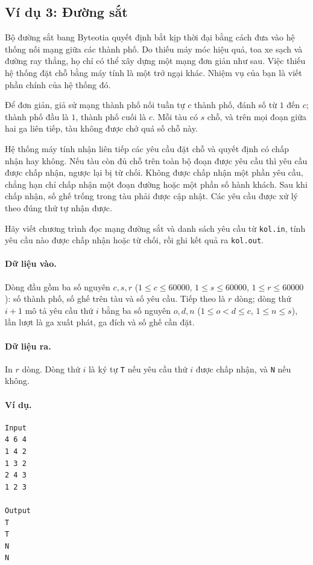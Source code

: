 \documentclass[11pt]{article}
\begin{document}
\subsection{Ví dụ 3: Đường sắt}

Bộ đường sắt bang Byteotia quyết định bắt kịp thời đại bằng cách đưa vào hệ
thống nối mạng giữa các thành phố. Do thiếu máy móc hiệu quả, toa xe sạch và
đường ray thẳng, họ chỉ có thể xây dựng một mạng đơn giản như sau. Việc thiếu
hệ thống đặt chỗ bằng máy tính là một trở ngại khác. Nhiệm vụ của bạn là viết
phần chính của hệ thống đó.

Để đơn giản, giả sử mạng thành phố nối tuần tự $c$ thành phố, đánh số từ
$1$ đến $c$; thành phố đầu là $1$, thành phố cuối là $c$. Mỗi tàu có $s$ chỗ,
và trên mọi đoạn giữa hai ga liên tiếp, tàu không được chở quá số chỗ này.

Hệ thống máy tính nhận liên tiếp các yêu cầu đặt chỗ và quyết định có chấp
nhận hay không. Nếu tàu còn đủ chỗ trên toàn bộ đoạn được yêu cầu thì yêu cầu
được chấp nhận, ngược lại bị từ chối. Không được chấp nhận một phần yêu cầu,
chẳng hạn chỉ chấp nhận một đoạn đường hoặc một phần số hành khách. Sau khi
chấp nhận, số ghế trống trong tàu phải được cập nhật. Các yêu cầu được xử lý
theo đúng thứ tự nhận được.

Hãy viết chương trình đọc mạng đường sắt và danh sách yêu cầu từ
\texttt{kol.in}, tính yêu cầu nào được chấp nhận hoặc từ chối, rồi ghi kết
quả ra \texttt{kol.out}.

\paragraph{Dữ liệu vào.}
Dòng đầu gồm ba số nguyên $c,s,r$
($1\le c\le 60000$, $1\le s\le 60000$, $1\le r\le 60000$): số thành phố, số
ghế trên tàu và số yêu cầu. Tiếp theo là $r$ dòng; dòng thứ $i+1$ mô tả yêu
cầu thứ $i$ bằng ba số nguyên $o,d,n$
($1\le o<d\le c$, $1\le n\le s$), lần lượt là ga xuất phát, ga đích và số
ghế cần đặt.

\paragraph{Dữ liệu ra.}
In $r$ dòng. Dòng thứ $i$ là ký tự \texttt{T} nếu yêu cầu thứ $i$ được chấp
nhận, và \texttt{N} nếu không.

\paragraph{Ví dụ.}
\begin{verbatim}
Input
4 6 4
1 4 2
1 3 2
2 4 3
1 2 3

Output
T
T
N
N
\end{verbatim}
\end{document}
